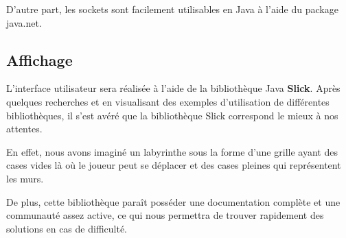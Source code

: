 D'autre part, les sockets sont facilement utilisables en Java à l'aide du package java.net.

\subsection{Affichage}
L'interface utilisateur sera réalisée à l'aide de la bibliothèque Java \textbf{Slick}. Après quelques recherches et en visualisant des exemples d'utilisation de différentes bibliothèques, il s'est avéré que la bibliothèque Slick correspond le mieux à nos attentes.

En effet, nous avons imaginé un labyrinthe sous la forme d'une grille ayant des cases vides là où le joueur peut se déplacer et des cases pleines qui représentent les murs.

De plus, cette bibliothèque paraît posséder une documentation complète et une communauté assez active, ce qui nous permettra de trouver rapidement des solutions en cas de difficulté.

